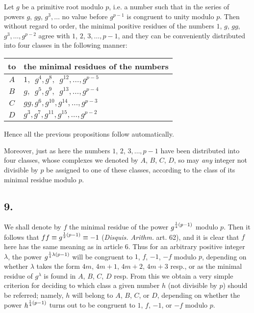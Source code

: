 \documentclass[twoside,12pt]{memoir}
\let\oldfrac\frac
\def\frac#1#2{\mathchoice{\tfrac{#1}{#2}}{\oldfrac{#1}{#2}}{\genfrac{}{}{}{2}{#1}{#2\mathstrut}}{\genfrac{}{}{}{3}{#1}{#2\mathstrut}}}
\begin{document}
Let \(g\) be a primitive root modulo \(p\), i{.}e{.} a number such that in the series of powers \(g\), \(g g\), \(g^3, \ldots\) no value before \(g^{p-1}\) is congruent to unity modulo \(p\). Then without regard to order, the minimal positive residues of the numbers \(1\), \(g\), \(g g\), \(g^3, \ldots, g^{p-2}\) agree with \(1\), \(2\), \(3, \ldots, p-1\), and they can be conveniently distributed into four classes in the following manner:
\begin{center}
\begin{tabular}{c|l}
to & the minimal residues of the numbers \\
\hline
\(A\) & \(1, \phantom{g}g^4, g^8, \phantom{g}g^{12}, \ldots, g^{p-5}\) \\
\(B\) & \(g, \phantom{g}g^5, g^9, \phantom{g}g^{13}, \ldots, g^{p-4}\) \\
\(C\) & \(g g, g^6, g^{10}, g^{14}, \ldots, g^{p-3}\) \\
\(D\) & \(g^3, g^7, g^{11}, g^{15}, \ldots, g^{p-2}\) \\
\end{tabular}
\end{center}

Hence all the previous propositions follow automatically.

Moreover, just as here the numbers \(1\), \(2\), \(3, \ldots, p-1\) have been distributed into four classes, whose complexes we denoted by \(A\), \(B\), \(C\), \(D\), so may \textit{any} integer not divisible by \(p\) be assigned to one of these classes, according to the class of its minimal residue modulo \(p\).
%

\subsection*{9.}

We shall denote by \(f\) the minimal residue of the power \(g^{\frac{1}{4}(p-1)}\) modulo \(p\).  Then it follows that \(f f \equiv g^{\frac{1}{2}(p-1)} \equiv -1\) (\textit{Disquis. Arithm.} art. 62), and it is clear that \(f\) here has the same meaning as in article 6.  Thus for an arbitrary positive integer \(\lambda\), the power \(g^{\frac{1}{4} \lambda(p-1)}\) will be congruent  to \(1\), \(f\), \(-1\), \(-f\) modulo \(p\), depending on whether \(\lambda\) takes the form \(4m\), \(4m+1\), \(4m+2\), \(4m+3\) resp{.}, or as the minimal residue of \(g^{\lambda}\) is found in \(A\), \(B\), \(C\), \(D\) resp.  From this we obtain a very simple criterion for deciding to which class a given number \(h\) (not divisible by \(p\)) should be referred; namely, \(h\) will belong to \(A\), \(B\), \(C\), or \(D\), depending on whether the power \(h^{\frac{1}{4}(p-1)}\) turns out to be congruent to \(1\), \(f\), \(-1\), or \(-f\) modulo \(p\).
\end{document}
